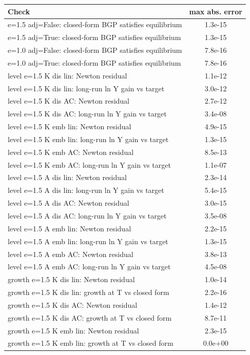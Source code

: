 \begin{tabular}{lc}\toprule Check & max abs. error\\\midrule
e=1.5 adj=False: closed-form BGP satisfies equilibrium & 1.3e-15\\
e=1.5 adj=True: closed-form BGP satisfies equilibrium & 1.3e-15\\
e=1.0 adj=False: closed-form BGP satisfies equilibrium & 7.8e-16\\
e=1.0 adj=True: closed-form BGP satisfies equilibrium & 7.8e-16\\
level e=1.5 K dis lin: Newton residual & 1.1e-12\\
level e=1.5 K dis lin: long-run ln Y gain vs target & 3.0e-12\\
level e=1.5 K dis AC: Newton residual & 2.7e-12\\
level e=1.5 K dis AC: long-run ln Y gain vs target & 3.4e-08\\
level e=1.5 K emb lin: Newton residual & 4.9e-15\\
level e=1.5 K emb lin: long-run ln Y gain vs target & 1.3e-15\\
level e=1.5 K emb AC: Newton residual & 8.5e-13\\
level e=1.5 K emb AC: long-run ln Y gain vs target & 1.1e-07\\
level e=1.5 A dis lin: Newton residual & 2.3e-14\\
level e=1.5 A dis lin: long-run ln Y gain vs target & 5.4e-15\\
level e=1.5 A dis AC: Newton residual & 3.0e-15\\
level e=1.5 A dis AC: long-run ln Y gain vs target & 3.5e-08\\
level e=1.5 A emb lin: Newton residual & 2.2e-15\\
level e=1.5 A emb lin: long-run ln Y gain vs target & 1.3e-15\\
level e=1.5 A emb AC: Newton residual & 3.8e-13\\
level e=1.5 A emb AC: long-run ln Y gain vs target & 4.5e-08\\
growth e=1.5 K dis lin: Newton residual & 1.0e-14\\
growth e=1.5 K dis lin: growth at T vs closed form & 2.2e-16\\
growth e=1.5 K dis AC: Newton residual & 1.4e-12\\
growth e=1.5 K dis AC: growth at T vs closed form & 8.7e-11\\
growth e=1.5 K emb lin: Newton residual & 2.3e-15\\
growth e=1.5 K emb lin: growth at T vs closed form & 0.0e+00\\

\end{tabular}
